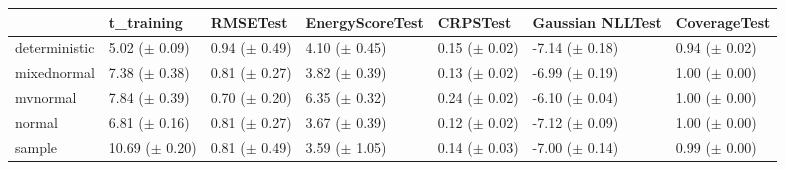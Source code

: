 \begin{tabular}{lllllll}
\toprule
 & t_training & RMSETest & EnergyScoreTest & CRPSTest & Gaussian NLLTest & CoverageTest \\
\midrule
deterministic & \makecell{5.02 \\ ($\pm$ 0.09)} & \makecell{0.94 \\ ($\pm$ 0.49)} & \makecell{4.10 \\ ($\pm$ 0.45)} & \makecell{0.15 \\ ($\pm$ 0.02)} & \makecell{-7.14 \\ ($\pm$ 0.18)} & \makecell{0.94 \\ ($\pm$ 0.02)} \\
mixednormal & \makecell{7.38 \\ ($\pm$ 0.38)} & \makecell{0.81 \\ ($\pm$ 0.27)} & \makecell{3.82 \\ ($\pm$ 0.39)} & \makecell{0.13 \\ ($\pm$ 0.02)} & \makecell{-6.99 \\ ($\pm$ 0.19)} & \makecell{1.00 \\ ($\pm$ 0.00)} \\
mvnormal & \makecell{7.84 \\ ($\pm$ 0.39)} & \makecell{0.70 \\ ($\pm$ 0.20)} & \makecell{6.35 \\ ($\pm$ 0.32)} & \makecell{0.24 \\ ($\pm$ 0.02)} & \makecell{-6.10 \\ ($\pm$ 0.04)} & \makecell{1.00 \\ ($\pm$ 0.00)} \\
normal & \makecell{6.81 \\ ($\pm$ 0.16)} & \makecell{0.81 \\ ($\pm$ 0.27)} & \makecell{3.67 \\ ($\pm$ 0.39)} & \makecell{0.12 \\ ($\pm$ 0.02)} & \makecell{-7.12 \\ ($\pm$ 0.09)} & \makecell{1.00 \\ ($\pm$ 0.00)} \\
sample & \makecell{10.69 \\ ($\pm$ 0.20)} & \makecell{0.81 \\ ($\pm$ 0.49)} & \makecell{3.59 \\ ($\pm$ 1.05)} & \makecell{0.14 \\ ($\pm$ 0.03)} & \makecell{-7.00 \\ ($\pm$ 0.14)} & \makecell{0.99 \\ ($\pm$ 0.00)} \\
\bottomrule
\end{tabular}

